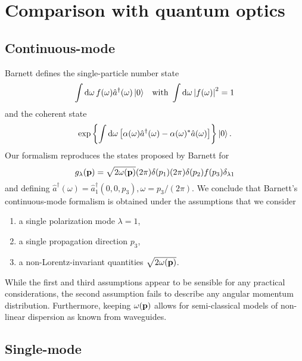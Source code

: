 \section{Comparison with quantum optics}

\subsection{Continuous-mode}

Barnett defines the single-particle number state~\cite[p.~51]{Barnett2002}
\begin{align}
	\int\dd{\omega}
	f(\omega)
	\hat{a}^\dagger(\omega)
	\ket{0}
	&&
	\text{with}\
	\int\dd{\omega}
	\abs{f(\omega)}^2
	=
	1
\end{align}
and the coherent state~\cite[p.~65]{Barnett2002}
\begin{equation}
	\exp\left\{
		\int\dd{\omega}
		\left[
			\alpha(\omega)
			\hat{a}^\dagger(\omega)
			-
			\alpha(\omega)^*
			\hat{a}(\omega)
		\right]
	\right\}
	\ket{0}
	.
\end{equation}
Our formalism reproduces the states proposed by Barnett for
\begin{equation}
	g_\lambda(\vb{p})
	=
	\sqrt{2\omega(\vb{p})}
	(2\pi)\delta(p_1)
	(2\pi)\delta(p_2)
	f(p_3)
	\delta_{\lambda1}
\end{equation}
and defining $\hat{a}^\dagger(\omega)=\hat{a}_1^\dagger(0,0,p_3),\omega=p_3/(2\pi)$.
We conclude that Barnett's continuous-mode formalism is obtained under the assumptions that we consider
\begin{enumerate}
	\item a single polarization mode $\lambda=1$,
	\item a single propagation direction $p_3$,
	\item a non-Lorentz-invariant quantities $\sqrt{2\omega(\vb{p})}$.
\end{enumerate}
While the first and third assumptions appear to be sensible for any practical considerations, the second assumption fails to describe any angular momentum distribution.
Furthermore, keeping $\omega(\vb{p})$ allows for semi-classical models of non-linear dispersion as known from waveguides.

\subsection{Single-mode}